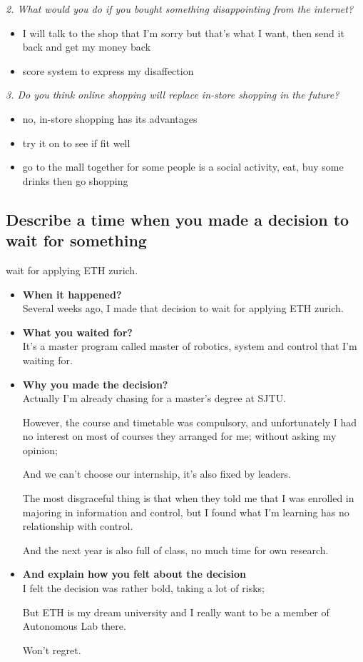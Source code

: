 \documentclass[conference]{IEEEtran}
\begin{document}
\textit{2. What would you do if you bought something disappointing from the internet?}
\begin{itemize}
    \item I will talk to the shop that I'm sorry but that's what I want, then send it back and get my money back
    \item score system to express my disaffection
\end{itemize}

\textit{3. Do you think online shopping will replace in-store shopping in the future?}
\begin{itemize}
    \item no, in-store shopping has its advantages
    \item try it on to see if fit well
    \item go to the mall together for some people is a social activity, eat, buy some drinks then go shopping
\end{itemize}

\subsection{Describe a time when you made a decision to wait for something}
wait for applying ETH zurich.
\begin{itemize}
    \item \textbf{When it happened?}\\
    Several weeks ago, I made that decision to wait for applying ETH zurich. 
    \item \textbf{What you waited for?}\\
    It's a master program called master of robotics, system and control that I'm waiting for.
    \item \textbf{Why you made the decision?}\\
    Actually I'm already chasing for a master's degree at SJTU.

    However, the course and timetable was compulsory, and unfortunately I had no interest on most of courses they arranged for me;
    without asking my opinion;

    And we can't choose our internship, it's also fixed by leaders.

    The most disgraceful thing is that when they told me that I was enrolled in majoring in information and control,
    but I found what I'm learning has no relationship with control.

    And the next year is also full of class, no much time for own research.
    \item \textbf{And explain how you felt about the decision}\\
    I felt the decision was rather bold, taking a lot of risks;

    But ETH is my dream university and I really want to be a member of Autonomous Lab there.

    Won't regret.
\end{itemize}
\end{document}
